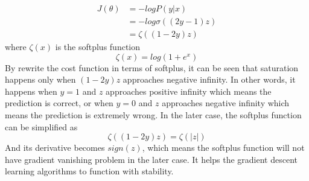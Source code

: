 \begin{equation}
    \begin{aligned}
        J(\theta) &= -logP(y|x) \\
        & = -log \sigma ((2y-1)z) \\
        & = \zeta ((1-2y)z)
    \end{aligned}
\end{equation}
%
where $\zeta(x)$ is the softplus function 
\begin{equation}
    \zeta(x) = log(1+e^x)
\end{equation}
%
By rewrite the cost function in terms of softplus, it can be seen that saturation happens only when $(1-2y)z$ approaches negative infinity.
In other words, it happens when $y=1$ and $z$ approaches positive infinity which means the prediction is correct, or when $y=0$ and $z$ approaches negative infinity which means the prediction is extremely wrong.
In the later case, the softplus function can be simplified as
\begin{equation}
    \zeta((1-2y)z) = \zeta(|z|)
\end{equation}
%
And its derivative becomes $sign(z)$, which means the softplus function will not have gradient vanishing problem in the later case.
It helps the gradient descent learning algorithms to function with stability.

